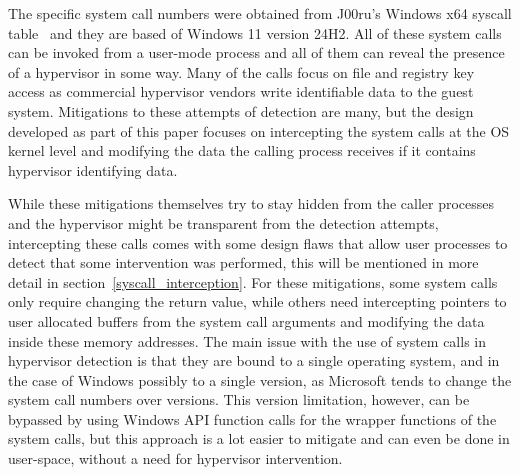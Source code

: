 The specific system call numbers were obtained from J00ru's Windows x64 syscall table~\cite{j00ruSyscalls} and they are based of Windows 11 version 24H2. All of these system calls can be invoked from a user-mode process and all of them can reveal the presence of a hypervisor in some way. 
Many of the calls focus on file and registry key access as commercial hypervisor vendors write identifiable data to the guest system. 
Mitigations to these attempts of detection are many, but the design developed as part of this paper focuses on intercepting the system calls at the OS kernel level 
and modifying the data the calling process receives if it contains hypervisor identifying data.

While these mitigations themselves try to stay hidden from the caller processes and the hypervisor might be transparent from the detection attempts, intercepting these calls comes with some design flaws that allow user processes to detect that
some intervention was performed, this will be mentioned in more detail in section~\ref{syscall_interception}.
For these mitigations, some system calls only require changing the return value, while others need intercepting pointers to user allocated buffers from the system call arguments and modifying the data inside these memory addresses.
The main issue with the use of system calls in hypervisor detection is that they are bound to a single operating system, and in the case of Windows possibly to a single version, as Microsoft tends to change the system call numbers over versions.
This version limitation, however, can be bypassed by using Windows API function calls for the wrapper functions of the system calls, but this approach is a lot easier to mitigate and can even be done in user-space, without a need for hypervisor intervention.

